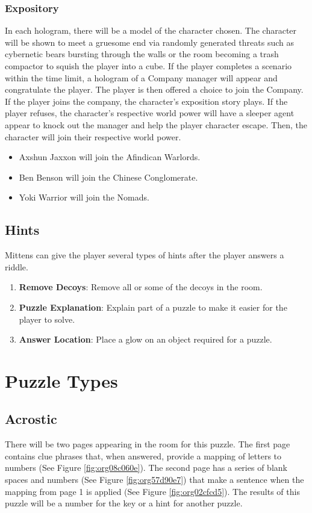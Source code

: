 \documentclass[12pt]{article}
\begin{document}
\subsubsection{Expository}
\label{sec:orgd5a280c}
In each hologram, there will be a model of the character chosen. The character will be shown to meet a gruesome end via randomly generated threats such as cybernetic bears bursting through the walls or the room becoming a trash compactor to squish the player into a cube. If the player completes a scenario within the time limit, a hologram of a Company manager will appear and congratulate the player. The player is then offered a choice to join the Company. If the player joins the company, the character's exposition story plays. If the player refuses, the character's respective world power will have a sleeper agent appear to knock out the manager and help the player character escape. Then, the character will join their respective world power.

\begin{itemize}
\item Axshun Jaxxon will join the Afindican Warlords.

\item Ben Benson will join the Chinese Conglomerate.

\item Yoki Warrior will join the Nomads.
\end{itemize}


\subsection{Hints}
\label{sec:orge3e46b8}
Mittens can give the player several types of hints after the player answers a riddle.
\begin{enumerate}
\item \textbf{Remove Decoys}: Remove all or some of the decoys in the room.
\item \textbf{Puzzle Explanation}: Explain part of a puzzle to make it easier for the player to solve.
\item \textbf{Answer Location}: Place a glow on an object required for a puzzle.
\end{enumerate}

\section{Puzzle Types}
\label{sec:org7e79aea}
\subsection{Acrostic}
\label{sec:org86c6001}
There will be two pages appearing in the room for this puzzle. The first page contains clue phrases that, when answered, provide a mapping of letters to numbers (See Figure \ref{fig:org08c060e}). The second page has a series of blank spaces and numbers (See Figure \ref{fig:org57d90e7}) that make a sentence when the mapping from page 1 is applied (See Figure \ref{fig:org02cfcd5}). The results of this puzzle will be a number for the key or a hint for another puzzle.
\end{document}
